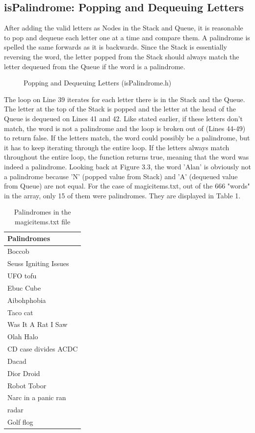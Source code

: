 \documentclass[letterpaper, 10pt]{article}
\begin{document}
\subsection{isPalindrome: Popping and Dequeuing Letters}
\noindent
After adding the valid letters as Nodes in the Stack and Queue, it is reasonable to pop and dequeue each letter one at a time and compare them. A palindrome is spelled the same forwards as it is backwards. Since the Stack is essentially reversing the word, the letter popped from the Stack should always match the letter dequeued from the Queue if the word is a palindrome.
\begin{figure}[H]
  \centering
  
  \caption{Popping and Dequeuing Letters (isPalindrome.h)}
  \label{fig:figure3.4}
\end{figure}
\noindent
The loop on Line 39 iterates for each letter there is in the Stack and the Queue. The letter at the top of the Stack is popped and the letter at the head of the Queue is dequeued on Lines 41 and 42. Like stated earlier, if these letters don't match, the word is not a palindrome and the loop is broken out of (Lines 44-49) to return false. If the letters match, the word could possibly be a palindrome, but it has to keep iterating through the entire loop. If the letters always match throughout the entire loop, the function returns true, meaning that the word was indeed a palindrome. Looking back at Figure 3.3, the word 'Alan' is obviously not a palindrome because 'N' (popped value from Stack) and 'A' (dequeued value from Queue) are not equal.
For the case of magicitems.txt, out of the 666 "words" in the array, only 15 of them were palindromes. They are displayed in Table 1.
\begin{table}[H]
    \centering
    \begin{tabular}{|l|}
        \hline
        \textbf{Palindromes} \\ \hline
        Boccob \\ 
        Seuss Igniting Issues \\ 
        UFO tofu \\ 
        Ebuc Cube \\ 
        Aibohphobia \\ 
        Taco cat \\ 
        Was It A Rat I Saw \\ 
        Olah Halo \\ 
        CD case divides ACDC \\ 
        Dacad \\ 
        Dior Droid \\ 
        Robot Tobor \\ 
        Narc in a panic ran \\ 
        radar \\ 
        Golf flog \\ \hline
    \end{tabular}
    \caption{Palindromes in the magicitems.txt file}
    \label{tab:tab1}
\end{table}
\end{document}
